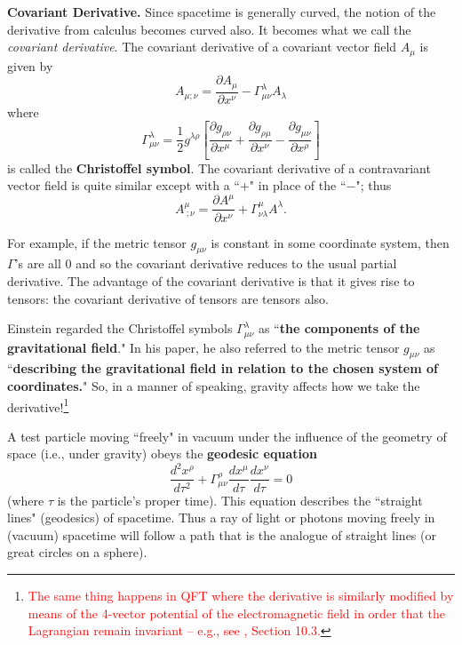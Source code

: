 \documentclass[12pt,reqno]{amsart}
\theoremstyle{definition}
\def\ccite#1{\textcolor{red}{\cite{#1}}}
\numberwithin{equation}{section}
\begin{document}
\medskip

{\bf Covariant Derivative.} Since spacetime is generally curved, the notion of the derivative from calculus becomes curved also. It becomes what we call the {\it covariant derivative}. The covariant derivative of a covariant vector field $A_\mu$ is given by
$$
A_{\mu; \nu} = \frac{\partial A_\mu}{\partial x^\nu} - \Gamma^{\lambda}_{\mu\nu} A_\lambda$$
where
$$
\Gamma^{\lambda}_{\mu\nu} = \frac12 g^{\lambda\rho}
\left[ 
\frac{\partial g_{\rho\nu}}{\partial x^\mu} + 
\frac{\partial g_{\rho\mu}}{\partial x^\nu} - 
\frac{\partial g_{\mu\nu}}{\partial x^\rho} \right]
$$
is called the {\bf Christoffel symbol}. The covariant derivative of a contravariant vector field is quite similar except with a ``$+$" in place of the ``$-$"; thus
$$
A^\mu_{\ ; \nu} = \frac{\partial A^\mu}{\partial x^\nu} + \Gamma^{\mu}_{\nu\lambda} A^\lambda.$$

For example, if the metric tensor $g_{\mu\nu}$ is constant in some coordinate system, then $\Gamma$'s are all 0 and so the covariant derivative reduces to the usual partial derivative. The advantage of the covariant derivative is that it gives rise to tensors: the covariant derivative of tensors are tensors also.

\medskip

Einstein regarded the Christoffel symbols $\Gamma^{\lambda}_{\mu\nu}$ as ``{\bf the components of the gravitational field}." In his paper, he also referred to the metric tensor $g_{\mu\nu}$ as ``{\bf describing the gravitational field in relation to the chosen system of coordinates.}" So, in a manner of speaking, gravity affects how we take the derivative!\footnote{\textcolor{red}{The same thing happens in QFT where the derivative is similarly modified by means of the 4-vector potential of the electromagnetic field in order that the Lagrangian remain invariant -- e.g., see \ccite{Griffiths}, Section 10.3.}}

\medskip

A test particle moving ``freely" in vacuum under the influence of the geometry of space (i.e., under gravity) obeys the {\bf geodesic equation} 
$$\frac{d^2 x^\rho}{d\tau^2} + 
\Gamma_{\mu\nu}^\rho \frac{dx^\mu}{d\tau} \frac{dx^\nu}{d\tau} = 0$$
(where $\tau$ is the particle's proper time). This equation describes the ``straight lines" \newline (geodesics) of spacetime. Thus a ray of light or photons moving freely in (vacuum) spacetime will follow a path that is the analogue of straight lines (or great circles on a sphere).
\end{document}
